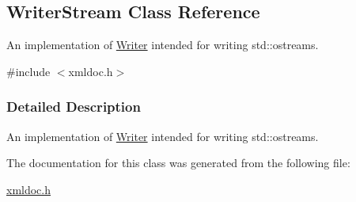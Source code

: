 \hypertarget{classWriterStream}{
\subsection{WriterStream Class Reference}
\label{classWriterStream}
}


An implementation of \hyperlink{classWriter}{Writer} intended for writing std::ostreams.  




{\ttfamily \#include $<$xmldoc.h$>$}



\subsubsection{Detailed Description}
An implementation of \hyperlink{classWriter}{Writer} intended for writing std::ostreams. 

The documentation for this class was generated from the following file:\begin{DoxyCompactItemize}
\item 
\hyperlink{xmldoc_8h}{xmldoc.h}\end{DoxyCompactItemize}
